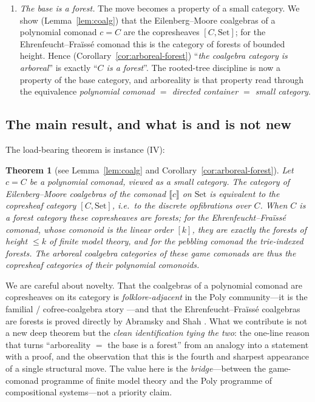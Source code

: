 \documentclass[11pt,reqno]{amsart}
\theoremstyle{plain}
\newtheorem{theorem}{Theorem}[section]
\theoremstyle{definition}
\newcommand{\Set}{\mathrm{Set}}
\newcommand{\sem}[1]{\llbracket #1 \rrbracket}
\newcommand{\cext}[1]{\sem{#1}}
\begin{document}
\begin{enumerate}
\item[(IV)] \emph{The base is a forest.} The move becomes a property of a small category. We show
(Lemma~\ref{lem:coalg}) that the Eilenberg--Moore coalgebras of a polynomial comonad $c = C$ are the
copresheaves $[C,\Set]$; for the Ehrenfeucht--Fra\"iss\'e comonad this is the category of forests of
bounded height. Hence (Corollary~\ref{cor:arboreal-forest}) ``\emph{the coalgebra category is arboreal}''
is exactly ``\emph{$C$ is a forest}''. The rooted-tree discipline is now a property of the base
category, and arboreality is that property read through the equivalence \emph{polynomial comonad $=$
directed container $=$ small category}.
\end{enumerate}

\subsection*{The main result, and what is and is not new}
The load-bearing theorem is instance (IV):

\begin{theorem}[see Lemma~\ref{lem:coalg} and Corollary~\ref{cor:arboreal-forest}]\label{thm:main}
Let $c = C$ be a polynomial comonad, viewed as a small category. The category of Eilenberg--Moore
coalgebras of the comonad $\cext{c}$ on $\Set$ is equivalent to the copresheaf category $[C,\Set]$,
i.e.\ to the discrete opfibrations over $C$. When $C$ is a forest category these copresheaves are
forests; for the Ehrenfeucht--Fra\"iss\'e comonad, whose comonoid is the linear order $[k]$, they are
exactly the forests of height $\le k$ of \textup{finite model theory}, and for the pebbling comonad the
trie-indexed forests. The arboreal coalgebra categories of these game comonads are thus the copresheaf
categories of their polynomial comonoids.
\end{theorem}

We are careful about novelty. That the coalgebras of a polynomial comonad are copresheaves on its
category is \emph{folklore-adjacent} in the Poly community---it is the familial / cofree-coalgebra
story \cite{SpivakGarnerFairbanks2025}---and that the Ehrenfeucht--Fra\"iss\'e coalgebras are forests is
proved directly by Abramsky and Shah \cite{AbramskyShah2021}. What we contribute is not a new deep
theorem but the \emph{clean identification tying the two}: the one-line reason that turns ``arboreality
$=$ the base is a forest'' from an analogy into a statement with a proof, and the observation that this
is the fourth and sharpest appearance of a single structural move. The value here is the
\emph{bridge}---between the game-comonad programme of finite model theory and the Poly programme of
compositional systems---not a priority claim.
\end{document}
